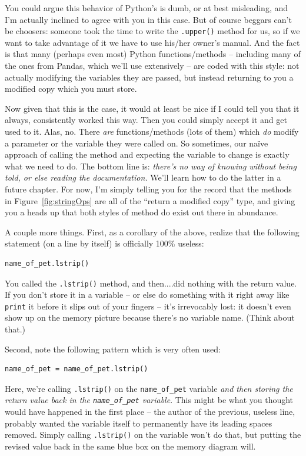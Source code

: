 You could argue this behavior of Python's is dumb, or at best misleading, and
I'm actually inclined to agree with you in this case. But of course beggars
can't be choosers: someone took the time to write the \texttt{.upper()} method
for us, so if we want to take advantage of it we have to use his/her owner's
manual. And the fact is that many (perhaps even most) Python functions/methods
-- including many of the ones from Pandas, which we'll use extensively -- are
coded with this style: not actually modifying the variables they are passed,
but instead returning to you a modified copy which you must store.

Now given that this is the case, it would at least be nice if I could tell you
that it always, consistently worked this way. Then you could simply accept it
and get used to it. Alas, no. There \textit{are} functions/methods (lots of
them) which \textit{do} modify a parameter or the variable they were called on.
So sometimes, our na\"{i}ve approach of calling the method and expecting the
variable to change is exactly what we need to do. The bottom line is:
\textit{there's no way of knowing without being told, or else reading the
documentation.} We'll learn how to do the latter in a future chapter. For now,
I'm simply telling you for the record that the methods in
Figure~\ref{fig:stringOps} are all of the ``return a modified copy'' type, and
giving you a heads up that both styles of method do exist out there in
abundance.

A couple more things. First, as a corollary of the above, realize that the
following statement (on a line by itself) is officially 100\% useless:

\begin{Verbatim}[fontsize=\small,samepage=true,frame=single,framesep=3mm]
name_of_pet.lstrip()
\end{Verbatim}

You called the \texttt{.lstrip()} method, and then....did nothing with the
return value. If you don't store it in a variable -- or else do something with
it right away like \texttt{print} it before it slips out of your fingers --
it's irrevocably lost: it doesn't even show up on the memory picture because
there's no variable name. (Think about that.)

Second, note the following pattern which is very often used:

\begin{Verbatim}[fontsize=\small,samepage=true,frame=single,framesep=3mm]
name_of_pet = name_of_pet.lstrip()
\end{Verbatim}

Here, we're calling \texttt{.lstrip()} on the \texttt{name\_of\_pet} variable
\textit{and then storing the return value back in the \texttt{name\_of\_pet}
variable}. This might be what you thought would have happened in the first
place -- the author of the previous, useless line, probably wanted the variable
itself to permanently have its leading spaces removed. Simply calling
\texttt{.lstrip()} on the variable won't do that, but putting the revised value
back in the same blue box on the memory diagram will.
